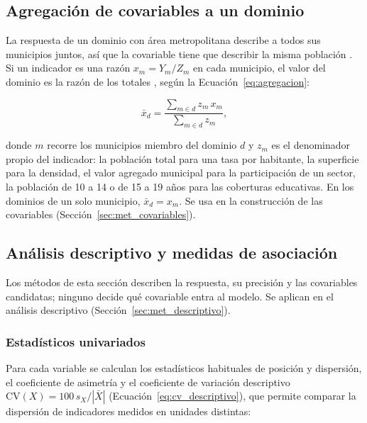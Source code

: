 \subsection{Agregación de covariables a un dominio}
\label{subsec:agregacion}

La respuesta de un dominio con área metropolitana describe a todos sus municipios juntos, así que la covariable tiene que describir la misma población \cite[p.~425]{morales2021smallarea}. Si un indicador es una razón $x_m = Y_m / Z_m$ en cada municipio, el valor del dominio es la razón de los totales \cite[p.~21]{morales2021smallarea}, según la Ecuación~\ref{eq:agregacion}:

\begin{equation}
    \bar{x}_d = \frac{\sum_{m \in d} z_m\, x_m}{\sum_{m \in d} z_m},
    \label{eq:agregacion}
\end{equation}

donde $m$ recorre los municipios miembro del dominio $d$ y $z_m$ es el denominador propio del indicador: la población total para una tasa por habitante, la superficie para la densidad, el valor agregado municipal para la participación de un sector, la población de 10 a 14 o de 15 a 19 años para las coberturas educativas. En los dominios de un solo municipio, $\bar{x}_d = x_m$. Se usa en la construcción de las covariables (Sección~\ref{sec:met_covariables}).

\subsection{Análisis descriptivo y medidas de asociación}

Los métodos de esta sección describen la respuesta, su precisión y las covariables candidatas; ninguno decide qué covariable entra al modelo. Se aplican en el análisis descriptivo (Sección~\ref{sec:met_descriptivo}).

\subsubsection{Estadísticos univariados}

Para cada variable se calculan los estadísticos habituales de posición y dispersión, el coeficiente de asimetría y el coeficiente de variación descriptivo $\text{CV}(X) = 100\, s_X / |\bar{X}|$ (Ecuación~\ref{eq:cv_descriptivo}), que permite comparar la dispersión de indicadores medidos en unidades distintas:

